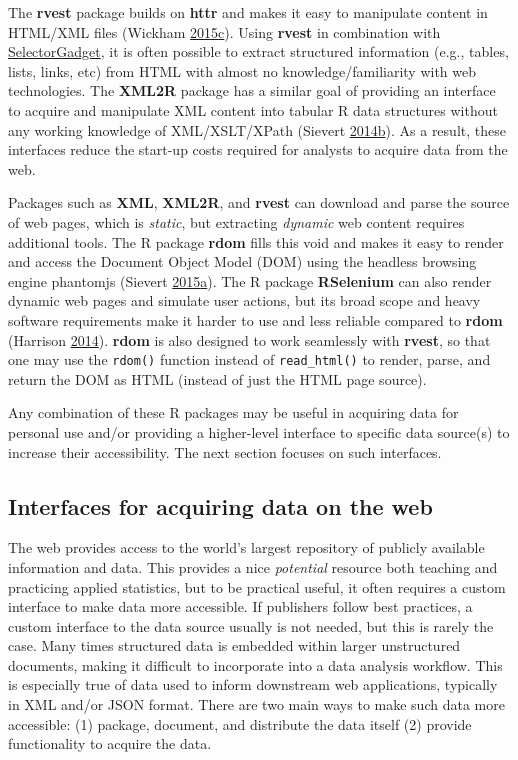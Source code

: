 \documentclass[12pt,]{isuthesis}
\begin{document}
The \textbf{rvest} package builds on \textbf{httr} and makes it easy to
manipulate content in HTML/XML files (Wickham
\protect\hyperlink{ref-rvest}{2015}\protect\hyperlink{ref-rvest}{c}).
Using \textbf{rvest} in combination with
\href{http://selectorgadget.com/}{SelectorGadget}, it is often possible
to extract structured information (e.g., tables, lists, links, etc) from
HTML with almost no knowledge/familiarity with web technologies. The
\textbf{XML2R} package has a similar goal of providing an interface to
acquire and manipulate XML content into tabular R data structures
without any working knowledge of XML/XSLT/XPath (Sievert
\protect\hyperlink{ref-Sievert:2014a}{2014}\protect\hyperlink{ref-Sievert:2014a}{b}).
As a result, these interfaces reduce the start-up costs required for
analysts to acquire data from the web.

Packages such as \textbf{XML}, \textbf{XML2R}, and \textbf{rvest} can
download and parse the source of web pages, which is \emph{static}, but
extracting \emph{dynamic} web content requires additional tools. The R
package \textbf{rdom} fills this void and makes it easy to render and
access the Document Object Model (DOM) using the headless browsing
engine phantomjs (Sievert
\protect\hyperlink{ref-rdom}{2015}\protect\hyperlink{ref-rdom}{a}). The
R package \textbf{RSelenium} can also render dynamic web pages and
simulate user actions, but its broad scope and heavy software
requirements make it harder to use and less reliable compared to
\textbf{rdom} (Harrison \protect\hyperlink{ref-RSelenium}{2014}).
\textbf{rdom} is also designed to work seamlessly with \textbf{rvest},
so that one may use the \texttt{rdom()} function instead of
\texttt{read\_html()} to render, parse, and return the DOM as HTML
(instead of just the HTML page source).

Any combination of these R packages may be useful in acquiring data for
personal use and/or providing a higher-level interface to specific data
source(s) to increase their accessibility. The next section focuses on
such interfaces.

\subsection{Interfaces for acquiring data on the
web}\label{interfaces-for-acquiring-data-on-the-web}

The web provides access to the world's largest repository of publicly
available information and data. This provides a nice \emph{potential}
resource both teaching and practicing applied statistics, but to be
practical useful, it often requires a custom interface to make data more
accessible. If publishers follow best practices, a custom interface to
the data source usually is not needed, but this is rarely the case. Many
times structured data is embedded within larger unstructured documents,
making it difficult to incorporate into a data analysis workflow. This
is especially true of data used to inform downstream web applications,
typically in XML and/or JSON format. There are two main ways to make
such data more accessible: (1) package, document, and distribute the
data itself (2) provide functionality to acquire the data.
\end{document}
